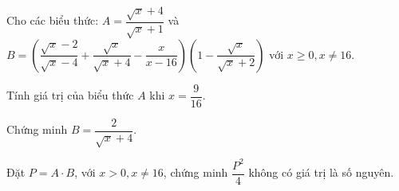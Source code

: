 
\begin{bt}
Cho các biểu thức: $A = \dfrac{\sqrt{x}+4}{\sqrt{x}+1}$ và $B = \left( \dfrac{\sqrt{x}-2}{\sqrt{x}-4} + \dfrac{\sqrt{x}}{\sqrt{x}+4} - \dfrac{x}{x-16} \right) \left( 1 - \dfrac{\sqrt{x}}{\sqrt{x}+2} \right)$ với $x \ge 0, x \ne 16$.
\begin{cacy}
\item Tính giá trị của biểu thức $A$ khi $x = \dfrac{9}{16}$.
\item Chứng minh $B = \dfrac{2}{\sqrt{x}+4}$.
\item Đặt $P = A \cdot B$, với $x > 0, x \ne 16$, chứng minh $\dfrac{P^2}{4}$ không có giá trị là số nguyên.
\end{cacy}
\loigiai{}
\end{bt}
